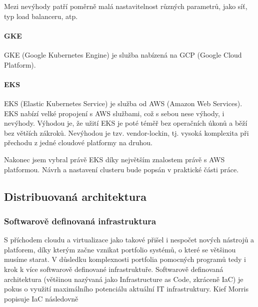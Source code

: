 \documentclass[thesis=M,czech]{FITthesis}[2019/12/23]
\theoremstyle{plain}
\theoremstyle{definition}
\begin{document}
Mezi nevýhody patří poměrně malá nastavitelnost různých parametrů, jako síť, typ load balanceru, atp. 


\paragraph{GKE}

GKE (Google Kubernetes Engine)\cite{gke} je služba nabízená na GCP (Google Cloud Platform). 



\paragraph{EKS}

EKS (Elastic Kubernetes Service)\cite{eks} je služba od AWS (Amazon Web Services). EKS nabízí velké propojení s AWS službami, což s sebou nese výhody, i nevýhody. Výhodou je, že užití EKS je poté téměř bez operačních úkonů a běží bez větších zákroků. Nevýhodou je tzv. vendor-lockin, tj. vysoká komplexita při přechodu z jedné cloudové platformy na druhou.



Nakonec jsem vybral právě EKS díky největším znalostem právě s AWS platformou. Návrh a nastavení clusteru bude popsán v praktické části práce. 








\subsection{Distribuovaná architektura}


\subsubsection{Softwarově definovaná infrastruktura}

S příchodem cloudu a virtualizace jako takové přišel i nespočet nových nástrojů a platforem, díky kterým začne vznikat portfolio systémů, o které se většinou musíme starat. V důsledku komplexnosti portfolia pomocných programů tedy i krok k více softwarově definované infrastruktuře. Softwarově definovaná architektura (většinou nazývaná jako Infrastructure as Code, zkráceně IaC) je pokus o využití maximálního potenciálu aktuální IT infrastruktury. Kief Morris \cite{kief-morris-iac} popisuje IaC následovně
\end{document}
